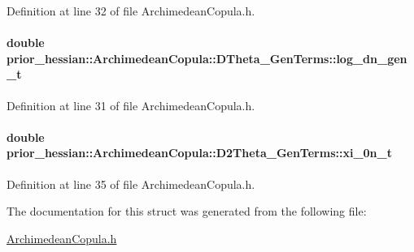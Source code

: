 Definition at line 32 of file Archimedean\+Copula.\+h.

\paragraph[{\texorpdfstring{log\+\_\+dn\+\_\+gen\+\_\+t}{log_dn_gen_t}}]{\setlength{\rightskip}{0pt plus 5cm}double prior\+\_\+hessian\+::\+Archimedean\+Copula\+::\+D\+Theta\+\_\+\+Gen\+Terms\+::log\+\_\+dn\+\_\+gen\+\_\+t\hspace{0.3cm}{\ttfamily [inherited]}}\hypertarget{structprior__hessian_1_1ArchimedeanCopula_1_1DTheta__GenTerms_a53b2585e2895a634b563e6f7a27546db}{}\label{structprior__hessian_1_1ArchimedeanCopula_1_1DTheta__GenTerms_a53b2585e2895a634b563e6f7a27546db}


Definition at line 31 of file Archimedean\+Copula.\+h.

\paragraph[{\texorpdfstring{xi\+\_\+0n\+\_\+t}{xi_0n_t}}]{\setlength{\rightskip}{0pt plus 5cm}double prior\+\_\+hessian\+::\+Archimedean\+Copula\+::\+D2\+Theta\+\_\+\+Gen\+Terms\+::xi\+\_\+0n\+\_\+t}\hypertarget{structprior__hessian_1_1ArchimedeanCopula_1_1D2Theta__GenTerms_ae9b7323650d21aeb9d5ac91c4ae74fac}{}\label{structprior__hessian_1_1ArchimedeanCopula_1_1D2Theta__GenTerms_ae9b7323650d21aeb9d5ac91c4ae74fac}


Definition at line 35 of file Archimedean\+Copula.\+h.



The documentation for this struct was generated from the following file\+:\begin{DoxyCompactItemize}
\item 
\hyperlink{ArchimedeanCopula_8h}{Archimedean\+Copula.\+h}\end{DoxyCompactItemize}
